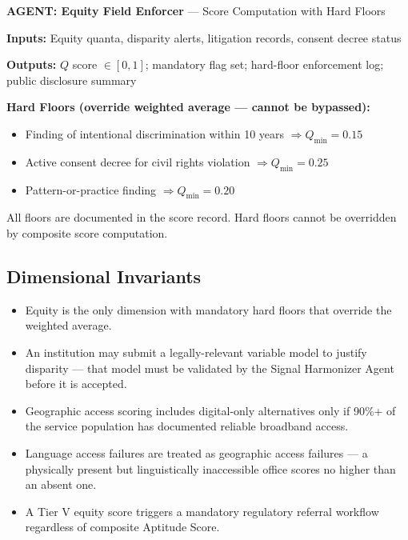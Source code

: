 \documentclass[a4paper,11pt]{article}
\begin{document}
	\medskip
	
	\begin{agentbox}
		\textbf{\sffamily\color{navy} AGENT: Equity Field Enforcer} — Score Computation with Hard Floors
		
		\medskip
		\textbf{Inputs:} Equity quanta, disparity alerts, litigation records, consent decree status
		
		\textbf{Outputs:} $Q$ score $\in [0,1]$; mandatory flag set; hard-floor enforcement log; public disclosure summary
		
		\textbf{Hard Floors (override weighted average — cannot be bypassed):}
		\begin{itemize}[leftmargin=1.5em]
			\item Finding of intentional discrimination within 10 years $\Rightarrow Q_{\min} = 0.15$
			\item Active consent decree for civil rights violation $\Rightarrow Q_{\min} = 0.25$
			\item Pattern-or-practice finding $\Rightarrow Q_{\min} = 0.20$
		\end{itemize}
		All floors are documented in the score record. Hard floors cannot be overridden by composite score computation.
	\end{agentbox}
	
	\subsection{Dimensional Invariants}
	
	\begin{itemize}[leftmargin=1.5em]
		\item Equity is the only dimension with mandatory hard floors that override the weighted average.
		\item An institution may submit a legally-relevant variable model to justify disparity — that model must be validated by the Signal Harmonizer Agent before it is accepted.
		\item Geographic access scoring includes digital-only alternatives only if 90\%+ of the service population has documented reliable broadband access.
		\item Language access failures are treated as geographic access failures — a physically present but linguistically inaccessible office scores no higher than an absent one.
		\item A Tier V equity score triggers a mandatory regulatory referral workflow regardless of composite Aptitude Score.
	\end{itemize}
	
\end{document}
